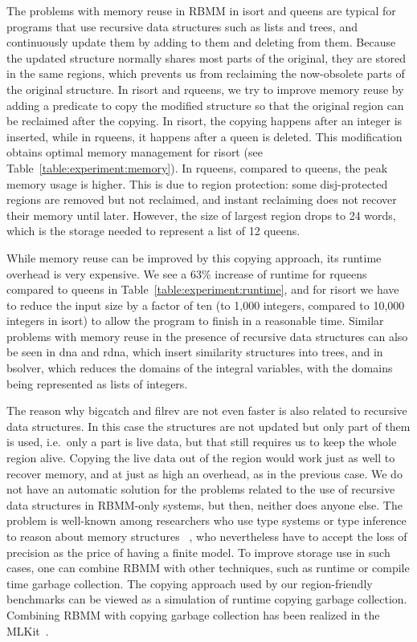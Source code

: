 \documentclass{tlp}
\newcommand{\bench}[1]{{#1}}
\begin{document}
The problems with memory reuse in RBMM in \bench{isort} and \bench{queens}
are typical for programs
that use recursive data structures such as lists and trees,
and continuously update them by adding to them and deleting from them.
Because the updated structure normally shares most parts of the original,
they are stored in the same regions,
which prevents us from reclaiming
the now-obsolete parts of the original structure.
In \bench{risort} and \bench{rqueens}, we try to improve memory reuse
by adding a predicate to copy the modified structure
so that the original region can be reclaimed after the copying.
In \bench{risort}, the copying happens after an integer is inserted,
while in \bench{rqueens}, it happens after a queen is deleted.
This modification obtains optimal memory management for \bench{risort}
(see Table~\ref{table:experiment:memory}).
In \bench{rqueens}, compared to \bench{queens},
the peak memory usage is higher.
This is due to region protection:
some disj-protected regions are removed but not reclaimed,
and instant reclaiming does not recover their memory until later.
However, the size of largest region drops to 24 words,
which is the storage needed to represent a list of 12 queens.

While memory reuse can be improved by this copying approach,
its runtime overhead is very expensive.
We see a 63\% increase of runtime
for \bench{rqueens} compared to \bench{queens}
in Table~\ref{table:experiment:runtime},
and for \bench{risort} we have to reduce the input size by a factor of ten
(to 1,000 integers, compared to 10,000 integers in \bench{isort})
to allow the program to finish in a reasonable time.
Similar problems with memory reuse in the presence of recursive data structures
can also be seen in \bench{dna} and \bench{rdna},
which insert similarity structures into trees,
and in \bench{bsolver}, which reduces the domains of the integral variables,
with the domains being represented as lists of integers.

The reason why \bench{bigcatch} and \bench{filrev} are not even faster
is also related to recursive data structures.
In this case the structures are not updated but only part of them is used,
i.e.\ only a part is live data,
but that still requires us to keep the whole region alive.
Copying the live data out of the region
would work just as well to recover memory,
and at just as high an overhead,
as in the previous case.
We do not have an automatic solution
for the problems related to the use of recursive data structures
in RBMM-only systems, but then, neither does anyone else.
The problem is well-known
among researchers who use type systems or type inference
to reason about memory structures
~\cite{Baker90,Chase90,TofteTalpin97,Henglein01hmn},
who nevertheless have to accept the loss of precision
as the price of having a finite model.
To improve storage use in such cases,
one can combine RBMM with other techniques,
such as runtime or compile time garbage collection.
The copying approach used by our region-friendly benchmarks
can be viewed as a simulation of runtime copying garbage collection.
Combining RBMM with copying garbage collection
has been realized in the MLKit~\cite{Hallenberg02}.
\end{document}
